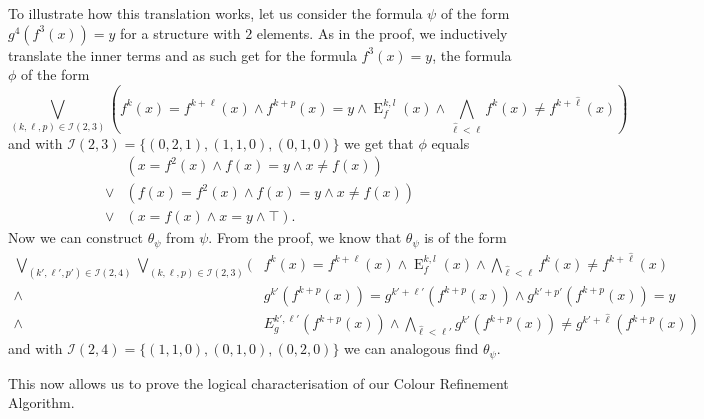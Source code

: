 To illustrate how this translation works, let us consider the formula $\psi$ of the form $g^4(f^3(x))=y$ for a structure with $2$ elements.
As in the proof, we inductively translate the inner terms and as such get for the formula $f^3(x)=y$, the formula $\phi$ of the form
$$\bigvee_{(k,\ell,p)\in \mathcal I(2,3)}\left(f^k(x)=f^{k+\ell}(x)\land f^{k+p}(x)=y \land \operatorname{E}^{k,l}_f(x)\land\bigwedge_{\hat \ell < \ell} f^k(x)\neq f^{k+\hat\ell}(x)\right)$$
and with $\mathcal I(2,3)=\{(0,2,1),(1,1,0),(0,1,0)\}$ we get that $\phi$ equals
\begin{align*}
	\phantom{\lor}&\left(x=f^2(x) \land f(x)=y \land x\neq f(x)\right) \\
	\lor & \left(f(x)=f^2(x) \land f(x)=y \land x \neq f(x)\right) \\
	\lor & \left(x=f(x) \land x=y \land \top\right).
\end{align*}
Now we can construct $\theta_\psi$ from $\psi$. 
From the proof, we know that $\theta_\psi$ is of the form
\begin{align*}
	\bigvee_{(k',\ell',p')\in \mathcal I(2,4)}\bigvee_{(k,\ell,p)\in \mathcal I(2,3)} ( &f^k(x)=f^{k+\ell}(x)\land \operatorname{E}^{k,l}_f(x)\land\bigwedge_{\hat{\ell}<\ell}f^k(x)\neq f^{k+\hat\ell}(x) \\
	\land & g^{k'}(f^{k+p}(x))=g^{k'+\ell'}(f^{k+p}(x)) \land g^{k'+p'}(f^{k+p}(x)) = y \\
	\land & E^{k',\ell'}_g(f^{k+p}(x)) \land \bigwedge_{\hat{\ell}<\ell'}g^{k'}(f^{k+p}(x))\neq g^{k'+\hat\ell}(f^{k+p}(x))
\end{align*}
and with $\mathcal I(2,4)=\{(1,1,0),(0,1,0), (0,2,0)\}$ we can analogous find $\theta_\psi$.

This now allows us to prove the logical characterisation of our Colour Refinement Algorithm.

